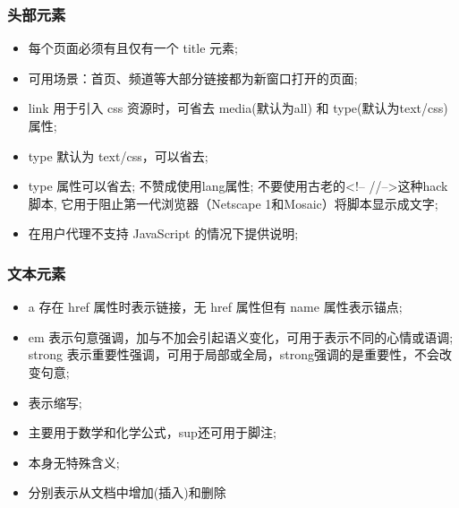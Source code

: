 \documentclass[letterpaper,10pt,english]{sphinxmanual}
\begin{document}
\subsubsection{头部元素}
\label{styleguide/html-coding-style:id7}\begin{itemize}
\item {}
 每个页面必须有且仅有一个 title 元素;

\item {}
 可用场景：首页、频道等大部分链接都为新窗口打开的页面;

\item {}
 link 用于引入 css 资源时，可省去 media(默认为all) 和 type(默认为text/css) 属性;

\item {}
 type 默认为 text/css，可以省去;

\item {}
 type 属性可以省去; 不赞成使用lang属性; 不要使用古老的\textless{}!– //–\textgreater{}这种hack脚本, 它用于阻止第一代浏览器（Netscape 1和Mosaic）将脚本显示成文字;

\item {}
 在用户代理不支持 JavaScript 的情况下提供说明;

\end{itemize}


\subsubsection{文本元素}
\label{styleguide/html-coding-style:id8}\begin{itemize}
\item {}
 a 存在 href 属性时表示链接，无 href 属性但有 name 属性表示锚点;

\item {}
 em 表示句意强调，加与不加会引起语义变化，可用于表示不同的心情或语调; strong 表示重要性强调，可用于局部或全局，strong强调的是重要性，不会改变句意;

\item {}
 表示缩写;

\item {}
 主要用于数学和化学公式，sup还可用于脚注;

\item {}
 本身无特殊含义;

\item {}
 分别表示从文档中增加(插入)和删除

\end{itemize}
\end{document}

